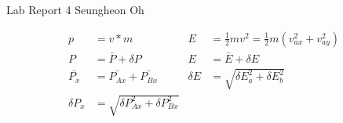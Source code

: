 \documentclass[10pt]{article}
\begin{document}
\LARGE 
\noindent
{\color{Maroon}Lab Report 4}\vspace{2pt}
\hfill \Large Seungheon Oh\vspace{2pt}

\begin{align*}
  p &= v * m & E &= \frac{1}{2}mv^2 = \frac{1}{2}m(v_{ax}^2+v_{ay}^2)\\
  P&= \bar{P} + \delta P & E &= \bar{E} + \delta E \\
  \bar{P_x} &= \bar{P_{Ax}} + \bar{P_{Bx}} & \delta E &= \sqrt{\delta E_a^2+\delta E_b^2}\\
  \delta P_x &= \sqrt{\delta P_{Ax}^2 + \delta P_{Bx}^2}
\end{align*}

\begin{center}
\end{center}

\normalsize
\end{document}
